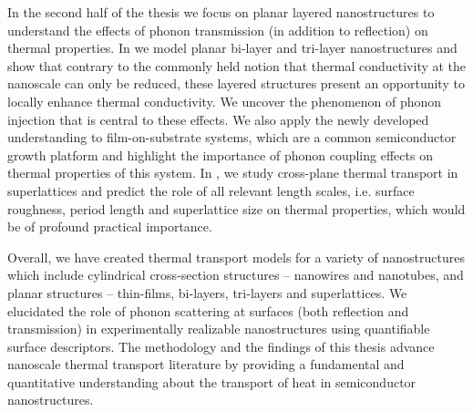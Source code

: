 In the second half of the thesis we focus on planar layered nanostructures to understand the effects of phonon transmission (in addition to reflection) on thermal properties. In  we model planar bi-layer and tri-layer nanostructures and show that contrary to the commonly held notion that thermal conductivity at the nanoscale can only be reduced, these layered structures present an opportunity to locally enhance thermal conductivity. We uncover the phenomenon of phonon injection that is central to these effects. We also apply the newly developed understanding to film-on-substrate systems, which are a common semiconductor growth platform and highlight the importance of phonon coupling effects on thermal properties of this system. In , we study cross-plane thermal transport in superlattices and predict the role of all relevant length scales, i.e. surface roughness, period length and superlattice size on thermal properties, which would be of profound practical importance.

Overall, we have created thermal transport models for a variety of nanostructures which include cylindrical cross-section structures -- nanowires and nanotubes, and planar structures -- thin-films, bi-layers, tri-layers and superlattices. We elucidated the role of phonon scattering at surfaces (both reflection and transmission) in experimentally realizable nanostructures using quantifiable surface descriptors. The methodology and the findings of this thesis advance nanoscale thermal transport literature by providing a fundamental and quantitative understanding about the transport of heat in semiconductor nanostructures.


